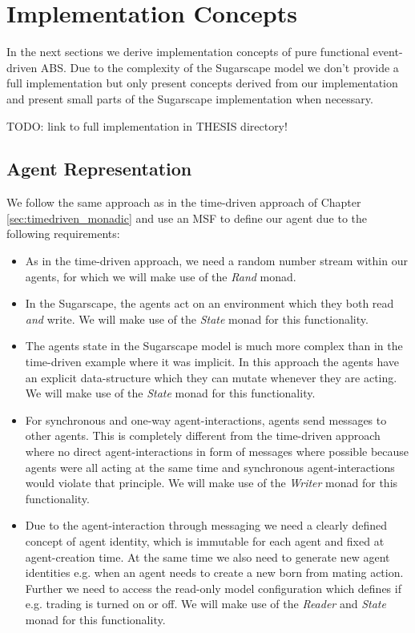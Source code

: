 \section{Implementation Concepts}
\label{sec:eventdriven_implementation}

In the next sections we derive implementation concepts of pure functional event-driven ABS. Due to the complexity of the Sugarscape model we don't provide a full implementation but only present concepts derived from our implementation and present small parts of the Sugarscape implementation when necessary.

TODO: link to full implementation in THESIS directory!

\subsection{Agent Representation}
We follow the same approach as in the time-driven approach of Chapter \ref{sec:timedriven_monadic} and use an MSF to define our agent due to the following requirements:

\begin{itemize}
	\item As in the time-driven approach, we need a random number stream within our agents, for which we will make use of the \textit{Rand} monad.
	
	\item In the Sugarscape, the agents act on an environment which they both read \textit{and} write. We will make use of the \textit{State} monad for this functionality. 
	
	\item The agents state in the Sugarscape model is much more complex than in the time-driven example where it was implicit. In this approach the agents have an explicit data-structure which they can mutate whenever they are acting. We will make use of the \textit{State} monad for this functionality.
	
	\item For synchronous and one-way agent-interactions, agents send messages to other agents. This is completely different from the time-driven approach where no direct agent-interactions in form of messages where possible because agents were all acting at the same time and synchronous agent-interactions would violate that principle. We will make use of the \textit{Writer} monad for this functionality.

	\item Due to the agent-interaction through messaging we need a clearly defined concept of agent identity, which is immutable for each agent and fixed at agent-creation time. At the same time we also need to generate new agent identities e.g. when an agent needs to create a new born from mating action. Further we need to access the read-only model configuration which defines if e.g. trading is turned on or off. We will make use of the \textit{Reader} and \textit{State} monad for this functionality.
\end{itemize}

